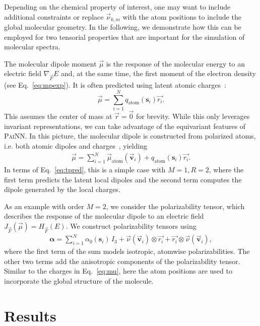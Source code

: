 \documentclass[reprint,
amsmath,amssymb,
 aip,jcp
]{revtex4-2}
\newcommand{\painn}{\textsc{PaiNN}}
\newcommand{\rr}{\vec{r}}
\newcommand{\q}{\mathbf{s}}
\newcommand{\mmu}{\vec{\mathbf{v}}}
\begin{document}
Depending on the chemical property of interest, one may want to include additional constraints or replace $\vec{\nu}_{k,m}$ with the atom positions to include the global molecular geometry.
In the following, we demonstrate how this can be employed for two tensorial properties that are important for the simulation of molecular spectra.

The molecular dipole moment $\vec{\mu}$ is the response of the molecular energy to an electric field $\nabla_{\vec{F}}  E$  and, at the same time, the first moment of the electron density (see Eq.~\ref{eq:mpexp}).
It is often predicted using latent atomic charges~\cite{gastegger2017machine}: 
\begin{equation}
\vec{\mu} = \sum_{i=1}^N q_\text{atom}(\q_i) \vec{r_i}. \label{eq:muold}
\end{equation}
This assumes the center of mass at $\rr=\vec{0}$ for brevity.
While this only leverages invariant representations, we can take advantage of the equivariant features of \painn{}.
In this picture, the molecular dipole is constructed from polarized atoms, i.e. both atomic dipoles and charges~\cite{veit2020predicting}, yielding
\begin{align}
    \vec{\mu} = \sum_{i=1}^N \vec{\mu}_\text{atom}(\mmu_i) + q_\text{atom}(\q_i) \vec{r_i}. \label{eq:mu}
\end{align}
In terms of Eq.~\ref{eq:tpred}, this is a simple case with $M=1, R=2$, where the first term predicts the latent local dipoles and the second term computes the dipole generated by the local charges.

As an example with order $M=2$, we consider the polarizability tensor, which describes the response of the molecular dipole to an electric field $J_{\vec{F}}(\vec{\mu}) = H_{\vec{F}}(E)$.
We construct polarizability tensors using
\begin{align}
    \bm{\alpha} = \sum_{i=1}^N \alpha_\text{0}(\q_i) \, I_3 +\vec{\nu}(\mmu_i) \otimes \vec{r_i} + \vec{r_i} \otimes \vec{\nu}(\mmu_i), \label{eq:alpha}
\end{align}
where the first term of the sum models isotropic, atomwise polarizabilities.
The other two terms add the anisotropic components of the polarizability tensor.
Similar to the charges in Eq.~\ref{eq:mu}, here the atom positions are used to incorporate the global structure of the molecule.


\section{Results}\label{sec:results}
\end{document}
